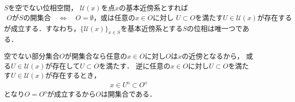 	\begin{screen}
		\begin{thm}[基本近傍系は開集合を決定する]\label{thm:local_base_defines_open_sets}
			$S$を空でない位相空間，
			$\mathscr{U}(x)$を点$x$の基本近傍系とすれば
			\begin{align}
				\mbox{$O$が$S$の開集合} \quad \Longleftrightarrow \quad 
				\mbox{$O = \emptyset$，或は任意の$x \in O$に対し
				$U \subset O$を満たす$U \in \mathscr{U}(x)$が存在する}
			\end{align}
			が成立する．すなわち，$\{\mathscr{U}(x)\}_{x \in S}$を基本近傍系とする$S$の位相は唯一つである．
		\end{thm}
	\end{screen}
	
	\begin{prf}
		空でない部分集合$O$が開集合なら任意の$x \in O$に対し$O$は$x$の近傍となるから，
		或る$U \in \mathscr{U}(x)$が存在して$U \subset O$を満たす．
		逆に任意の$x \in O$に対し$U \subset O$を満たす$U \in \mathscr{U}(x)$が存在するとき，
		\begin{align}
			x \in U^{\mathrm{o}} \subset O^{\mathrm{o}}
		\end{align}
		となり$O = O^{\mathrm{o}}$が成立するから$O$は開集合である．
		\QED
	\end{prf}
	
